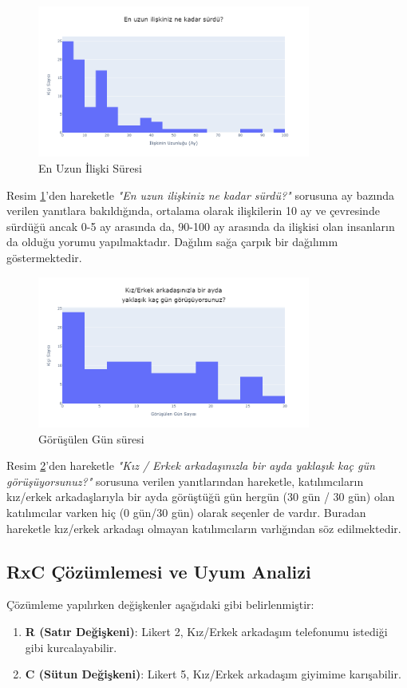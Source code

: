 \documentclass{article}
\begin{document}
\onecolumn
\begin{figure}[htbp]
    \centering
    \includegraphics[width=0.8\textwidth]{Imgs/soru14.png}
    \caption{En Uzun İlişki Süresi}
    \label{soru14}
\end{figure}
Resim \ref{soru14}'den hareketle \textit{"En uzun ilişkiniz ne kadar sürdü?"} sorusuna ay bazında verilen yanıtlara bakıldığında, ortalama olarak ilişkilerin 10 ay ve çevresinde sürdüğü ancak 0-5 ay arasında da, 90-100 ay arasında da ilişkisi olan insanların da olduğu yorumu yapılmaktadır. Dağılım sağa çarpık bir dağılımm göstermektedir.

\begin{figure}[htbp]
    \centering
    \includegraphics[width=0.8\textwidth]{Imgs/soru15.png}
    \caption{Görüşülen Gün süresi}
    \label{soru15}
\end{figure}
Resim \ref{soru15}'den hareketle \textit{"Kız / Erkek arkadaşınızla bir ayda yaklaşık kaç gün görüşüyorsunuz?"} sorusuna verilen yanıtlarından hareketle, katılımcıların kız/erkek arkadaşlarıyla bir ayda görüştüğü gün hergün (30 gün / 30 gün) olan katılımcılar varken hiç (0 gün/30 gün) olarak seçenler de vardır. Buradan hareketle kız/erkek arkadaşı olmayan katılımcıların varlığından söz edilmektedir.

\clearpage
\vspace{20pt}
\subsection{RxC Çözümlemesi ve Uyum Analizi}
Çözümleme yapılırken değişkenler aşağıdaki gibi belirlenmiştir:
\begin{enumerate}
    \item \textbf{R (Satır Değişkeni)}: Likert 2, Kız/Erkek arkadaşım telefonumu istediği gibi kurcalayabilir.
    \item \textbf{C (Sütun Değişkeni)}: Likert 5, Kız/Erkek arkadaşım giyimime karışabilir.
\end{enumerate}
\end{document}
